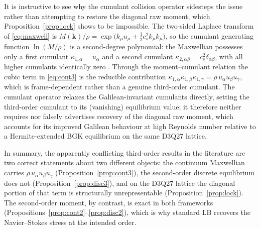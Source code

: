 \documentclass[preprint,11pt]{elsarticle}
\newcommand{\cs}{c_s}
\begin{document}
It is instructive to see why the cumulant collision operator
\citep{Geier2015} sidesteps the issue rather than attempting to restore the
diagonal raw moment, which Proposition~\ref{prop:lock} shows to be
impossible. The two-sided Laplace transform of \eqref{eq:maxwell} is
$M(\mathbf{k})/\rho=\exp\!\big(k_\mu u_\mu+\tfrac12\cs^{2}k_\mu k_\mu\big)$,
so the cumulant generating function $\ln(M/\rho)$ is a second-degree
polynomial: the Maxwellian possesses only a first cumulant
$\kappa_{1,\alpha}=u_\alpha$ and a second cumulant
$\kappa_{2,\alpha\beta}=\cs^{2}\delta_{\alpha\beta}$, with all higher
cumulants identically zero \citep{Geier2015}. Through the moment--cumulant
relation the cubic term in \eqref{eq:cont3} is the reducible contribution
$\kappa_{1,\alpha}\kappa_{1,\beta}\kappa_{1,\gamma}
=\rho\,u_\alpha u_\beta u_\gamma$, which is frame-dependent rather than a
genuine third-order cumulant. The cumulant operator relaxes the
Galilean-invariant cumulants directly, setting the third-order cumulant to
its (vanishing) equilibrium value; it therefore neither requires nor
falsely advertises recovery of the diagonal raw moment, which accounts for
its improved Galilean behaviour at high Reynolds number relative to a
Hermite-extended BGK equilibrium on the same D3Q27 lattice.

In summary, the apparently conflicting third-order results in the literature
are two correct statements about two different objects: the continuum
Maxwellian carries $\rho\,u_\alpha u_\beta u_\gamma$
(Proposition~\ref{prop:cont3}), the second-order discrete equilibrium does
not (Proposition~\ref{prop:disc3}), and on the D3Q27 lattice the diagonal
portion of that term is structurally unrepresentable
(Proposition~\ref{prop:lock}). The second-order moment, by contrast, is exact
in both frameworks (Propositions~\ref{prop:cont2}--\ref{prop:disc2}), which is
why standard LB recovers the Navier--Stokes stress at the intended order.
\end{document}
